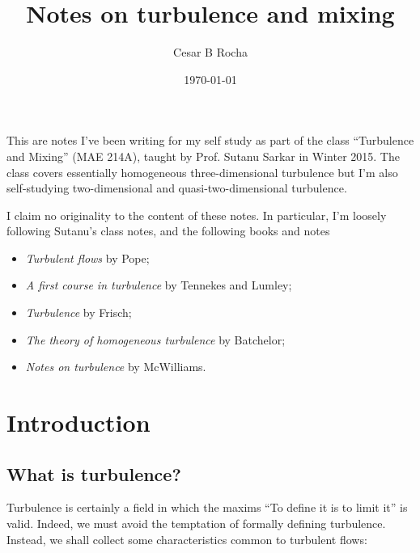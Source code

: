 \documentclass[11pt]{article}
\title{Notes on turbulence and mixing}
\author{Cesar B Rocha}
\date{\today}
\begin{document}


\maketitle

This are notes I've been writing for my self study as part of the class ``Turbulence and Mixing'' (MAE 214A), taught by Prof. Sutanu Sarkar in Winter 2015. The class covers essentially homogeneous three-dimensional turbulence but I'm also self-studying two-dimensional and quasi-two-dimensional turbulence. 

I claim no originality to the content of these notes.  In particular, I'm loosely following Sutanu's class notes, and the following books and notes

\begin{itemize}

    \item \textit{Turbulent flows} by Pope;

    \item \textit{A first course in turbulence} by Tennekes and Lumley;

    \item \textit{Turbulence} by Frisch;

    \item \textit{The theory of homogeneous turbulence} by Batchelor;

    \item \textit{Notes on turbulence} by McWilliams.

\end{itemize}

\section{Introduction}

\subsection{What is turbulence?}

Turbulence is certainly a field in which the maxims ``To define it is to limit it'' is valid. Indeed, we must avoid the temptation of formally defining turbulence. Instead, we shall collect some characteristics common to turbulent flows:
\end{document}
